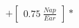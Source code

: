 \documentclass[preview]{standalone}
\begin{document}
\begin{align*}
+ \begin{bmatrix} 0.75 \ \frac{Nap}{Ear} \end{bmatrix} *
\end{align*}
\end{document}
